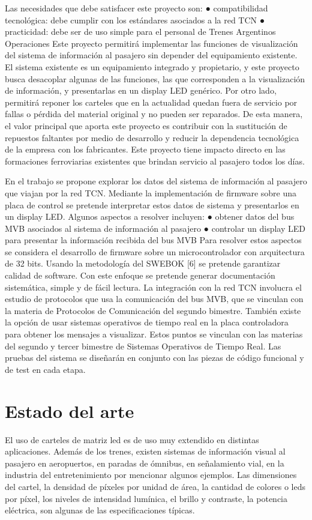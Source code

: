 Las necesidades que debe satisfacer este proyecto son:
● compatibilidad tecnológica: debe cumplir con los estándares asociados a la red TCN
● practicidad: debe ser de uso simple para el personal de Trenes Argentinos Operaciones
Este proyecto permitirá implementar las funciones de visualización del sistema de información al
pasajero sin depender del equipamiento existente. El sistema existente es un equipamiento
integrado y propietario, y este proyecto busca desacoplar algunas de las funciones, las que
corresponden a la visualización de información, y presentarlas en un display LED genérico. Por
otro lado, permitirá reponer los carteles que en la actualidad quedan fuera de servicio por fallas o
pérdida del material original y no pueden ser reparados. De esta manera, el valor principal que
aporta este proyecto es contribuir con la sustitución de repuestos faltantes por medio de
desarrollo y reducir la dependencia tecnológica de la empresa con los fabricantes. Este proyecto
tiene impacto directo en las formaciones ferroviarias existentes que brindan servicio al pasajero
todos los días.


En el trabajo se propone explorar los datos del sistema de información al pasajero que viajan por
la red TCN. Mediante la implementación de firmware sobre una placa de control se pretende
interpretar estos datos de sistema y presentarlos en un display LED. Algunos aspectos a resolver
incluyen:
● obtener datos del bus MVB asociados al sistema de información al pasajero
● controlar un display LED para presentar la información recibida del bus MVB
Para resolver estos aspectos se considera el desarrollo de firmware sobre un microcontrolador
con arquitectura de 32 bits. Usando la metodología del SWEBOK [6] se pretende garantizar
calidad de software. Con este enfoque se pretende generar documentación sistemática, simple y
de fácil lectura. La integración con la red TCN involucra el estudio de protocolos que usa la
comunicación del bus MVB, que se vinculan con la materia de Protocolos de Comunicación del
segundo bimestre. También existe la opción de usar sistemas operativos de tiempo real en la
placa controladora para obtener los mensajes a visualizar. Estos puntos se vinculan con las
materias del segundo y tercer bimestre de Sistemas Operativos de Tiempo Real. Las pruebas del
sistema se diseñarán en conjunto con las piezas de código funcional y de test en cada etapa.

\pagebreak
\section{Estado del arte}
El uso de carteles de matriz led es de uso muy extendido en distintas aplicaciones. Además de los trenes,  existen sistemas de información visual al pasajero en aeropuertos, en paradas de ómnibus, en señalamiento vial, en la industria del entretenimiento por mencionar algunos ejemplos. Las dimensiones del cartel, la densidad de píxeles por unidad de área, la cantidad de colores o leds por píxel, los niveles de intensidad lumínica, el brillo y contraste, la potencia eléctrica, son algunas de las especificaciones típicas.\\

